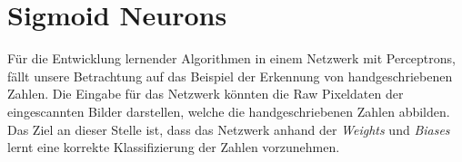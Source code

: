 \section{Sigmoid Neurons}
Für die Entwicklung lernender Algorithmen in einem Netzwerk mit Perceptrons, fällt unsere Betrachtung auf das Beispiel der Erkennung von handgeschriebenen Zahlen. Die Eingabe für das Netzwerk könnten die Raw Pixeldaten der eingescannten Bilder darstellen, welche die handgeschriebenen Zahlen abbilden. Das Ziel an dieser Stelle ist, dass das Netzwerk anhand der \textit{Weights} und \textit{Biases} lernt eine korrekte Klassifizierung der Zahlen vorzunehmen.